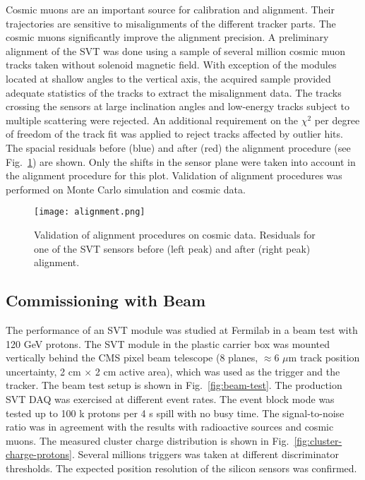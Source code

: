Cosmic muons are an important source for calibration and alignment. Their trajectories are sensitive to misalignments of the different tracker parts. The cosmic muons significantly improve the alignment precision. A preliminary alignment of the SVT was done using a sample of several million cosmic muon tracks taken without solenoid magnetic field. With exception of the modules located at shallow angles to the vertical axis, the acquired sample provided adequate statistics of the tracks to extract the misalignment data. The tracks crossing the sensors at large inclination angles and low-energy tracks subject to multiple scattering were rejected. An additional requirement on the $\chi^2$ per degree of freedom of the track fit was applied to reject tracks affected by outlier hits. The spacial residuals before (blue) and after (red) the alignment procedure (see Fig.~\ref{fig:alignment}) are shown. Only the shifts in the sensor plane were taken into account in the alignment procedure for this plot. Validation of alignment procedures was performed on Monte Carlo simulation and cosmic data.

\begin{figure}[hbt] 
\centering 
\texttt{[image: alignment.png]}
\caption{Validation of alignment procedures on cosmic data. Residuals for one of the SVT sensors before (left peak) and after (right peak) alignment.}
\label{fig:alignment}
\end{figure}

\subsection{Commissioning with Beam}

The performance of an SVT module was studied at Fermilab in a beam test with 120 GeV protons. The SVT module in the plastic carrier box was mounted vertically behind the CMS pixel beam telescope (8 planes, $\approx$6 $\mu$m track position uncertainty, 2 cm $\times$ 2 cm active area), which was used as the trigger and the tracker. The beam test setup is shown in Fig.~\ref{fig:beam-test}. The production SVT DAQ was exercised at different event rates. The event block mode was tested up to 100 k protons per 4 s spill with no busy time. The signal-to-noise ratio was in agreement with the results with radioactive sources and cosmic muons. The measured cluster charge distribution is shown in Fig.~\ref{fig:cluster-charge-protons}. Several millions triggers was taken at different discriminator thresholds.  The expected position resolution of the silicon sensors was confirmed. 


